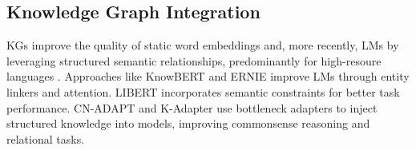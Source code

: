 \subsection{Knowledge Graph Integration}  
KGs improve the quality of static word embeddings \cite{faruqui2014retrofitting, speer2017conceptnet, gurgurov2024gremlinrepositorygreenbaseline} and, more recently, LMs by leveraging structured semantic relationships, predominantly for high-resoure languages \cite{miller1995wordnet, navigli2012babelnet, speer2017conceptnet}. Approaches like KnowBERT \cite{peters-etal-2019-knowledge} and ERNIE \cite{zhang-etal-2019-ernie} improve LMs through entity linkers and attention. LIBERT \cite{lauscher2020specializingunsupervisedpretrainingmodels} incorporates semantic constraints for better task performance. CN-ADAPT \cite{lauscher2020common} and K-Adapter \cite{wang2020k} use bottleneck adapters \cite{houlsby2019parameter} to inject structured knowledge into models, improving commonsense reasoning and relational tasks. %